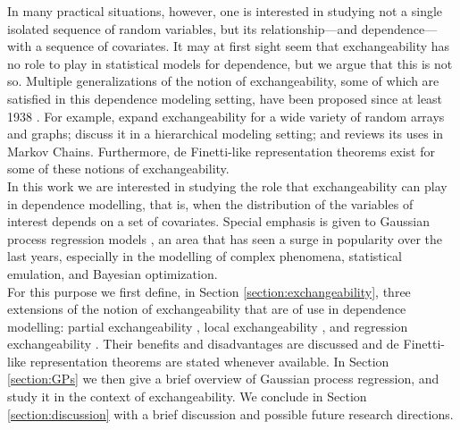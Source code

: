 In many practical situations, however, one is interested in studying not a single isolated sequence of random variables, but its relationship---and dependence---with a sequence of covariates. It may at first sight seem that exchangeability has no role to play in statistical models for dependence, but we argue that this is not so. Multiple generalizations of the notion of exchangeability, some of which are satisfied in this dependence modeling setting, have been proposed since at least 1938 \cite{deFinetti:1938:partial_exch}. For example, \cite{Aldous:2010, Orbanz:Roy:2015} expand exchangeability for a wide variety of random arrays and graphs; \cite{Bernardo:1996:Exch, CamerlenghiEtAl:2019:partial_exchang_hierarchical} discuss it in a hierarchical modeling setting; and \cite{Diaconis:1988:PartialExchang} reviews its uses in Markov Chains. Furthermore, de Finetti-like representation theorems exist for some of these notions of exchangeability. 
\\


In this work we are interested in studying the role that exchangeability can play in dependence modelling, that is, when the distribution of the variables of interest depends on a set of covariates. Special emphasis is given to Gaussian process regression models \cite{RasmussenWilliams:2006}, an area that has seen a surge in popularity over the last years, especially in the modelling of complex phenomena, statistical emulation, and Bayesian optimization.
\\


For this purpose we first define, in Section \ref{section:exchangeability}, three extensions of the notion of exchangeability that are of use in dependence modelling: partial exchangeability \cite{deFinetti:1938:partial_exch}, local exchangeability \cite{CampbellEtAl:2019:LocalExch}, and regression exchangeability \cite{McCullagh:2005:ExchAndReg}. Their benefits and disadvantages are discussed and de Finetti-like representation theorems are stated whenever available. In Section \ref{section:GPs} we then give a brief overview of Gaussian process regression, and study it in the context of exchangeability. We conclude in Section \ref{section:discussion} with a brief discussion and possible future research directions.





